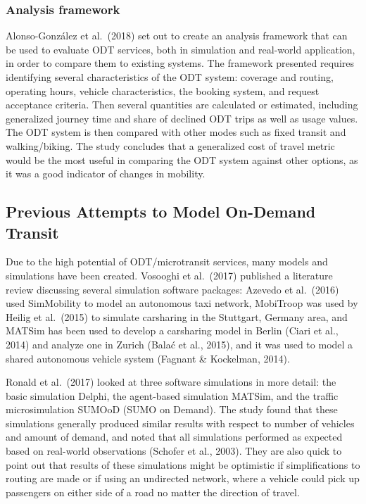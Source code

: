 \documentclass[
]{article}
\begin{document}
\hypertarget{analysis-framework}{%
\subsubsection{Analysis framework}\label{analysis-framework}}

Alonso-González et al.~(2018) set out to create an analysis framework that can be used to evaluate ODT services, both in simulation and real-world application, in order to compare them to existing systems. The framework presented requires identifying several characteristics of the ODT system: coverage and routing, operating hours, vehicle characteristics, the booking system, and request acceptance criteria. Then several quantities are calculated or estimated, including generalized journey time and share of declined ODT trips as well as usage values. The ODT system is then compared with other modes such as fixed transit and walking/biking. The study concludes that a generalized cost of travel metric would be the most useful in comparing the ODT system against other options, as it was a good indicator of changes in mobility.

\hypertarget{previous-attempts-to-model-on-demand-transit}{%
\subsection{Previous Attempts to Model On-Demand Transit}\label{previous-attempts-to-model-on-demand-transit}}

Due to the high potential of ODT/microtransit services, many models and simulations have been created. Vosooghi et al.~(2017) published a literature review discussing several simulation software packages: Azevedo et al.~(2016) used SimMobility to model an autonomous taxi network, MobiTroop was used by Heilig et al.~(2015) to simulate carsharing in the Stuttgart, Germany area, and MATSim has been used to develop a carsharing model in Berlin (Ciari et al., 2014) and analyze one in Zurich (Balać et al., 2015), and it was used to model a shared autonomous vehicle system (Fagnant \& Kockelman, 2014).

Ronald et al.~(2017) looked at three software simulations in more detail: the basic simulation Delphi, the agent-based simulation MATSim, and the traffic microsimulation SUMOoD (SUMO on Demand). The study found that these simulations generally produced similar results with respect to number of vehicles and amount of demand, and noted that all simulations performed as expected based on real-world observations (Schofer et al., 2003). They are also quick to point out that results of these simulations might be optimistic if simplifications to routing are made or if using an undirected network, where a vehicle could pick up passengers on either side of a road no matter the direction of travel.
\end{document}
